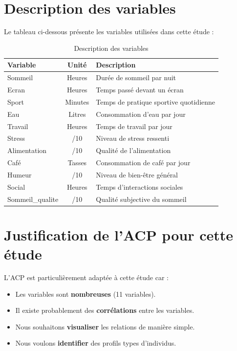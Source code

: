 \documentclass[12pt,a4paper]{book}
\begin{document}
	\section{Description des variables}
	
	Le tableau ci-dessous présente les variables utilisées dans cette étude :
	
	\begin{table}[H]
		\centering
		\caption{Description des variables}
		\begin{tabular}{lcp{8cm}}
			\toprule
			\textbf{Variable} & \textbf{Unité} & \textbf{Description} \\
			\midrule
			Sommeil & Heures & Durée de sommeil par nuit \\
			Ecran & Heures & Temps passé devant un écran \\
			Sport & Minutes & Temps de pratique sportive quotidienne \\
			Eau & Litres & Consommation d'eau par jour \\
			Travail & Heures & Temps de travail par jour \\
			Stress & /10 & Niveau de stress ressenti \\
			Alimentation & /10 & Qualité de l'alimentation \\
			Café & Tasses & Consommation de café par jour \\
			Humeur & /10 & Niveau de bien-être général \\
			Social & Heures & Temps d'interactions sociales \\
			Sommeil\_qualite & /10 & Qualité subjective du sommeil \\
			\bottomrule
		\end{tabular}
	\end{table}
	
	\section{Justification de l'ACP pour cette étude}
	
	L'ACP est particulièrement adaptée à cette étude car :
	
	\begin{itemize}
		\item Les variables sont \textbf{nombreuses} (11 variables).
		\item Il existe probablement des \textbf{corrélations} entre les variables.
		\item Nous souhaitons \textbf{visualiser} les relations de manière simple.
		\item Nous voulons \textbf{identifier} des profils types d'individus.
	\end{itemize}
	
\end{document}
